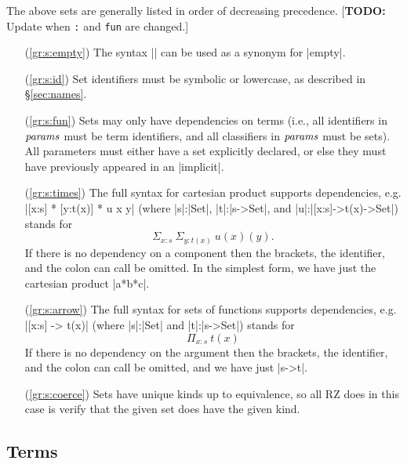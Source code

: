 \documentclass[11pt]{article}
\newcommand{\metav}[1]{\mbox{\textit{#1}}}
\newcommand{\Params}{\metav{params}}
\newcommand{\TODO}[1]{[\textbf{TODO: }#1]}
\begin{document}
The above sets are generally listed in order of decreasing precedence.  \TODO{Update when \texttt{:} and \texttt{fun} are changed.}
\begin{itemize}
\item[(\ref{gr:s:empty})] The syntax |{}| can be used as a synonym for |empty|.
\item[(\ref{gr:s:id})] Set identifiers must be symbolic or lowercase, as described in \S\ref{sec:names}.
\item[(\ref{gr:s:fun})] Sets may only have dependencies on terms (i.e., all identifiers in $\Params$ must be term identifiers, and all classifiers in $\Params$ must be sets).  All parameters must either have a set explicitly declared, or else they must have previously appeared in an |implicit|.
\item[(\ref{gr:s:times})] The full syntax for cartesian product supports dependencies, e.g. |[x:s] * [y:t(x)] * u x y| (where |s|:|Set|, |t|:|s->Set|, and |u|:|[x:s]->t(x)->Set|) stands
for 
\[
\Sigma_{x:s}\ \Sigma_{y:t(x)}\ u(x)(y).
\]
If there is no dependency on a component then the brackets, the identifier, and the colon can call be omitted.  In the simplest form, we have just the cartesian product |a*b*c|.
\item[(\ref{gr:s:arrow})] The full syntax for sets of functions supports dependencies, e.g. |[x:s] -> t(x)| (where |s|:|Set| and |t|:|s->Set|) stands
for 
\[
\Pi_{x:s}\ t(x)
\]
If there is no dependency on the argument then the brackets, the identifier, and the colon can call be omitted, and we have just |s->t|.
\item[(\ref{gr:s:coerce})] Sets have unique kinds up to equivalence, so all RZ does in this case is verify that the given set does have the given kind.
\end{itemize}

\subsection{Terms}
\end{document}
